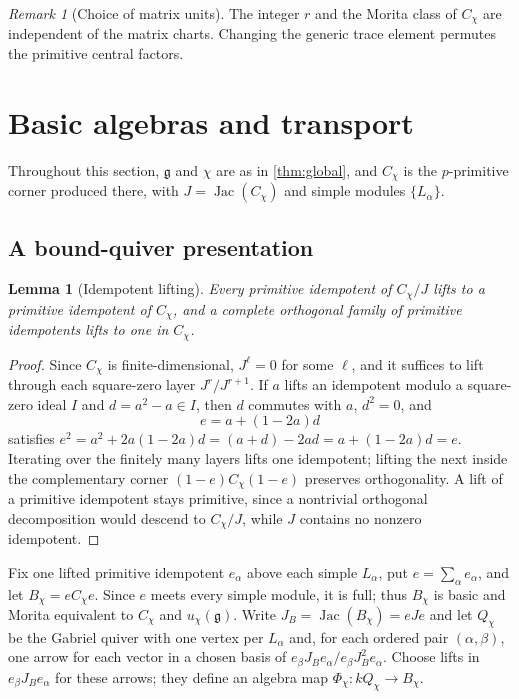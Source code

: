 \documentclass[11pt,reqno]{amsart}
\newtheorem{lemma}[lemma]{Lemma}
\theoremstyle{definition}
\theoremstyle{remark}
\newtheorem{remark}[remark]{Remark}
\theoremstyle{definition}
\newcommand{\Jac}{\operatorname{Jac}}
\begin{document}
\begin{remark}[Choice of matrix units]
The integer $r$ and the Morita class of $C_\chi$ are independent of
the matrix charts. Changing the generic trace element permutes the
primitive central factors.
\end{remark}

\section{Basic algebras and transport}\label{sec:harvest}

Throughout this section, $\mathfrak g$ and $\chi$ are as in \cref{thm:global},
and $C_\chi$ is the $p$-primitive corner produced there, with
$J=\Jac(C_\chi)$ and simple modules $\{L_\alpha\}$.

\subsection{A bound-quiver presentation}

\begin{lemma}[Idempotent lifting]\label{lem:idempotent-lift}
Every primitive idempotent of $C_\chi/J$ lifts to a primitive idempotent of
$C_\chi$, and a complete orthogonal family of primitive idempotents lifts to
one in $C_\chi$.
\end{lemma}

\begin{proof}
Since $C_\chi$ is finite-dimensional, $J^\ell=0$ for some $\ell$, and it
suffices to lift through each square-zero layer $J^r/J^{r+1}$.  If $a$ lifts
an idempotent modulo a square-zero ideal $I$ and $d=a^2-a\in I$, then $d$
commutes with $a$, $d^2=0$, and
\[
 e=a+(1-2a)d
\]
satisfies $e^2=a^2+2a(1-2a)d=(a+d)-2ad=a+(1-2a)d=e$.  Iterating over the
finitely many layers lifts one idempotent; lifting the next inside the
complementary corner $(1-e)C_\chi(1-e)$ preserves orthogonality.  A lift of
a primitive idempotent stays primitive, since a nontrivial orthogonal
decomposition would descend to $C_\chi/J$, while $J$ contains no nonzero
idempotent.
\end{proof}

Fix one lifted primitive idempotent $e_\alpha$ above each simple
$L_\alpha$, put $e=\sum_\alpha e_\alpha$, and let
$B_\chi=eC_\chi e$. Since $e$ meets every simple module, it is full;
thus $B_\chi$ is basic and Morita equivalent to $C_\chi$ and
$u_\chi(\mathfrak g)$.  Write
$J_B=\Jac(B_\chi)=eJe$ and let $Q_\chi$ be the Gabriel quiver with one
vertex per $L_\alpha$ and, for each ordered pair $(\alpha,\beta)$, one
arrow for each vector in a chosen basis of
$e_\beta J_Be_\alpha/e_\beta J_B^2e_\alpha$. Choose lifts in
$e_\beta J_Be_\alpha$ for these arrows; they define an algebra map
$\Phi_\chi:kQ_\chi\to B_\chi$.
\end{document}
